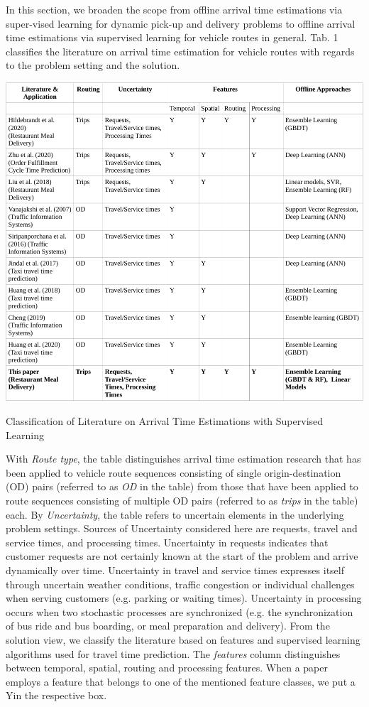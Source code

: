 In this section, we broaden the scope from offline arrival time estimations via super-vised learning for dynamic pick-up and delivery problems to offline arrival time estimations via supervised learning for vehicle routes in general.
Tab. 1 classifies the literature on arrival time estimation for vehicle routes with regards to the problem setting and the solution.
\begin{table}
	\centering
	\includegraphics[width=\linewidth]{figures/LiteratureClassification.pdf}
	\caption{Classification of Literature on Arrival Time Estimations with Supervised Learning}
	\label{tab:literatureTable}
\end{table}
With \textit{Route type}, the table distinguishes arrival time estimation research that has been applied to vehicle route sequences consisting of single origin-destination (OD) pairs (referred to as \textit{OD} in the table) from those that have been applied to route sequences consisting of multiple OD pairs (referred to as \textit{trips} in the table) each.
By \textit{Uncertainty}, the table refers to uncertain elements in the underlying problem settings. Sources of Uncertainty considered here are requests, travel and service times, and processing times. Uncertainty in requests indicates that customer requests are not certainly known at the start of the problem and arrive dynamically over time. Uncertainty in travel and service times expresses itself through uncertain weather conditions, traffic congestion or individual challenges when serving customers (e.g. parking or waiting times). Uncertainty in processing occurs when two stochastic processes are synchronized (e.g. the synchronization of bus ride and bus boarding, or meal preparation and delivery). From the solution view, we classify the literature based on features and supervised learning algorithms used for travel time prediction. The \textit{features} column distinguishes between temporal, spatial, routing and processing features. When a paper employs a feature that belongs to one of the mentioned feature classes, we put a \glqq Y\grqq in the respective box. 
